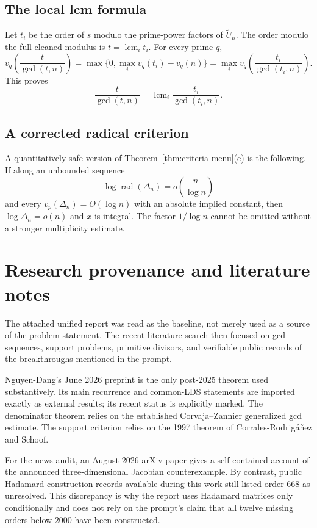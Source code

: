 \documentclass[11pt,oneside]{article}
\theoremstyle{definition}
\theoremstyle{remark}
\newcommand{\rad}{\operatorname{rad}}
\begin{document}
\subsection{The local lcm formula}

Let $t_i$ be the order of $s$ modulo the prime-power factors of $\widetilde U_n$.  The order
modulo the full cleaned modulus is $t=\operatorname{lcm}_i t_i$.  For every prime $q$,
\[
 v_q\!\left(\frac{t}{\gcd(t,n)}\right)
 =\max\{0,\max_i v_q(t_i)-v_q(n)\}
 =\max_i v_q\!\left(\frac{t_i}{\gcd(t_i,n)}\right).
\]
This proves
\[
 \frac{t}{\gcd(t,n)}
 =\operatorname{lcm}_i\frac{t_i}{\gcd(t_i,n)}.
\]

\subsection{A corrected radical criterion}

A quantitatively safe version of Theorem~\ref{thm:criteria-menu}(e) is the following.  If
along an unbounded sequence
\[
 \log\rad(\Delta_n)=o\!\left(\frac{n}{\log n}\right)
\]
and every $v_p(\Delta_n)=O(\log n)$ with an absolute implied constant, then
$\log\Delta_n=o(n)$ and $x$ is integral.  The factor $1/\log n$ cannot be omitted without a
stronger multiplicity estimate.

\section{Research provenance and literature notes}
\label{app:provenance}

The attached unified report was read as the baseline, not merely used as a source of the
problem statement.  The recent-literature search then focused on gcd sequences, support
problems, primitive divisors, and verifiable public records of the breakthroughs mentioned in
the prompt.

Nguyen-Dang's June 2026 preprint is the only post-2025 theorem used substantively.  Its main
recurrence and common-LDS statements are imported exactly as external results; its recent
status is explicitly marked.  The denominator theorem relies on the established
Corvaja--Zannier generalized gcd estimate.  The support criterion relies on the 1997 theorem
of Corrales-Rodrig\'a\~nez and Schoof.

For the news audit, an August 2026 arXiv paper gives a self-contained account of the announced
three-dimensional Jacobian counterexample.  By contrast, public Hadamard construction
records available during this work still listed order $668$ as unresolved.  This discrepancy
is why the report uses Hadamard matrices only conditionally and does not rely on the prompt's
claim that all twelve missing orders below $2000$ have been constructed.
\end{document}
